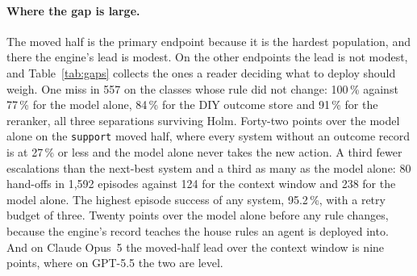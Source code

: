 \documentclass[11pt]{article}
\newcommand{\code}[1]{\texttt{#1}}
\begin{document}
\paragraph{Where the gap is large.} The moved half is the primary endpoint because it is the
hardest population, and there the engine's lead is modest. On the other endpoints the lead is
not modest, and Table~\ref{tab:gaps} collects the ones a reader deciding what to deploy should
weigh. One miss in 557 on the classes whose rule did not change: 100\,\% against 77\,\% for the
model alone, 84\,\% for the DIY outcome store and 91\,\% for the reranker, all three
separations surviving Holm. Forty-two points over the model alone on the \code{support} moved
half, where every system without an outcome record is at 27\,\% or less and the model alone
never takes the new action. A third fewer escalations than the next-best system and a third as
many as the model alone: 80 hand-offs in 1,592 episodes against 124 for the context window and
238 for the model alone. The highest episode success of any system, 95.2\,\%, with a retry budget of three.
Twenty points over the model alone before any rule changes, because the engine's record teaches
the house rules an agent is deployed into. And on Claude Opus~5 the moved-half lead over the
context window is nine points, where on GPT-5.5 the two are level.
\end{document}
